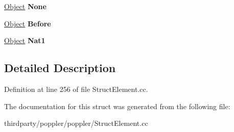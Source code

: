\begin{DoxyCompactItemize}
\mbox{\label{struct_attribute_defaults_a287b748addb64b6fce4d8cf8d215e1f1}} 
\hyperlink{class_object}{Object} {\bfseries None}
\item 
\mbox{\label{struct_attribute_defaults_a8199e31565e04f23e52757c87da2e7b8}} 
\hyperlink{class_object}{Object} {\bfseries Before}
\item 
\mbox{\label{struct_attribute_defaults_aeac5b950fe598a6b61589c6d15dbf5a6}} 
\hyperlink{class_object}{Object} {\bfseries Nat1}
\end{DoxyCompactItemize}


\subsection{Detailed Description}


Definition at line 256 of file Struct\+Element.\+cc.



The documentation for this struct was generated from the following file\+:\begin{DoxyCompactItemize}
\item 
thirdparty/poppler/poppler/Struct\+Element.\+cc\end{DoxyCompactItemize}
